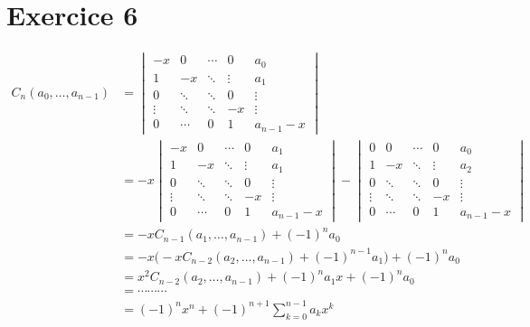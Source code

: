 \part{Exercice 6}

\begin{align*}
	C_n(a_0, \ldots, a_{n-1}) &= \begin{vmatrix}
		-x & 0 & \cdots & 0 & a_0\\
		1 & -x & \ddots & \vdots & a_1\\
		0 & \ddots & \ddots & 0 & \vdots\\
		\vdots & \ddots & \ddots & -x & \vdots\\
		0&\cdots&0&1&a_{n-1}-x
	\end{vmatrix}
	\\
	&= -x
	\begin{vmatrix}
		-x & 0 & \cdots & 0 & a_1\\
		1 & -x & \ddots & \vdots & a_1\\
		0 & \ddots & \ddots & 0 & \vdots\\
		\vdots & \ddots & \ddots & -x & \vdots\\
		0&\cdots&0&1&a_{n-1}-x
	\end{vmatrix} - 
	\begin{vmatrix}
		0 & 0 & \cdots & 0 & a_0\\
		1 & -x & \ddots & \vdots & a_2\\
		0 & \ddots & \ddots & 0 & \vdots\\
		\vdots & \ddots & \ddots & -x & \vdots\\
		0&\cdots&0&1&a_{n-1}-x
	\end{vmatrix}\\
	&= -x C_{n-1}(a_1, \ldots, a_{n-1}) + (-1)^n a_0 \\
	&= -x \big(-x C_{n-2}(a_2, \ldots, a_{n-1}) + (-1)^{n-1}a_1\big) + (-1)^n a_0 \\
	&= x^2 C_{n-2}(a_2, \ldots, a_{n-1}) + (-1)^n a_1 x + (-1)^n a_0 \\
	&= \cdots\cdots\cdots \\[-3.5mm]
	&=(-1)^n x^n + (-1)^{n+1} \sum_{k=0}^{n-1} a_k x^k \\
\end{align*}

